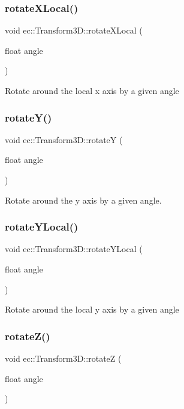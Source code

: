 \subsubsection{\texorpdfstring{rotate\+X\+Local()}{rotateXLocal()}}
{\footnotesize\ttfamily void ec\+::\+Transform3\+D\+::rotate\+X\+Local (\begin{DoxyParamCaption}\item[{float}]{angle }\end{DoxyParamCaption})}

Rotate around the local x axis by a given angle \mbox{\label{classec_1_1_transform3_d_a3e365a26befa6aabeb2e0b3ca680dd4f}} 
\subsubsection{\texorpdfstring{rotate\+Y()}{rotateY()}}
{\footnotesize\ttfamily void ec\+::\+Transform3\+D\+::rotateY (\begin{DoxyParamCaption}\item[{float}]{angle }\end{DoxyParamCaption})}

Rotate around the y axis by a given angle. \mbox{\label{classec_1_1_transform3_d_abfc79987e5fc4c805c5ff479d2c8b624}} 
\subsubsection{\texorpdfstring{rotate\+Y\+Local()}{rotateYLocal()}}
{\footnotesize\ttfamily void ec\+::\+Transform3\+D\+::rotate\+Y\+Local (\begin{DoxyParamCaption}\item[{float}]{angle }\end{DoxyParamCaption})}

Rotate around the local y axis by a given angle \mbox{\label{classec_1_1_transform3_d_afb339cf9f8c44fa6db954eb82af63c5b}} 
\subsubsection{\texorpdfstring{rotate\+Z()}{rotateZ()}}
{\footnotesize\ttfamily void ec\+::\+Transform3\+D\+::rotateZ (\begin{DoxyParamCaption}\item[{float}]{angle }\end{DoxyParamCaption})}

